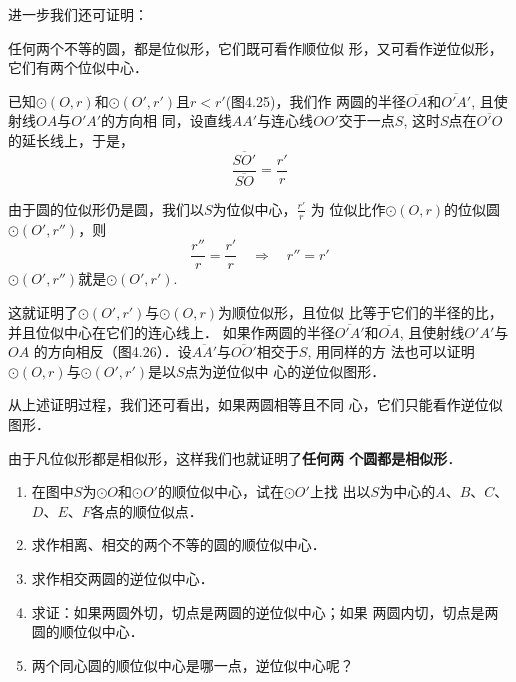 进一步我们还可证明：

\begin{blk}{}
任何两个不等的圆，都是位似形，它们既可看作顺位似
形，又可看作逆位似形，它们有两个位似中心．
\end{blk}

已知$\odot (O,r)$和$\odot (O',r')$且$r<r'$(图4.25)，我们作
两圆的半径$\overline{OA}$和$\overline{O'A'}$, 且使射线$OA$与$O'A'$的方向相
同，设直线$AA'$与连心线$OO'$交于一点$S$, 这时$S$点在$\overline{O'O}$
的延长线上，于是，
\[\frac{\overline{SO'}}{\overline{SO}}=\frac{r'}{r}\]

由于圆的位似形仍是圆，我们以$S$为位似中心，$\frac{r'}{r}$
为
位似比作$\odot (O,r)$的位似圆$\odot (O',r'')$，则
\[\frac{r''}{r}=\frac{r'}{r}\quad \Rightarrow\quad r''=r'\]
$\odot (O',r'')$就是$\odot (O',r')$.

这就证明了$\odot (O',r')$与$\odot (O,r)$为顺位似形，且位似
比等于它们的半径的比，并且位似中心在它们的连心线上．
如果作两圆的半径$\overline{O'A'}$和$\overline{OA}$, 且使射线$O'A'$与$OA$
的方向相反（图4.26）．设$\overline{AA'}$与$\overline{OO'}$相交于$S$, 用同样的方
法也可以证明$\odot (O,r)$与$\odot (O',r')$是以$S$点为逆位似中
心的逆位似图形．

从上述证明过程，我们还可看出，如果两圆相等且不同
心，它们只能看作逆位似图形．

由于凡位似形都是相似形，这样我们也就证明了\textbf{任何两
个圆都是相似形}．

\begin{ex}
\begin{enumerate}
    \item 在图中$S$为$\odot O$和$\odot O'$的顺位似中心，试在$\odot O'$上找
    出以$S$为中心的$A$、$B$、$C$、$D$、$E$、$F$各点的顺位似点．
    \item 求作相离、相交的两个不等的圆的顺位似中心．
    \item 求作相交两圆的逆位似中心．
    \item 求证：如果两圆外切，切点是两圆的逆位似中心；如果
    两圆内切，切点是两圆的顺位似中心．
    \item 两个同心圆的顺位似中心是哪一点，逆位似中心呢？
\end{enumerate}
\end{ex}

